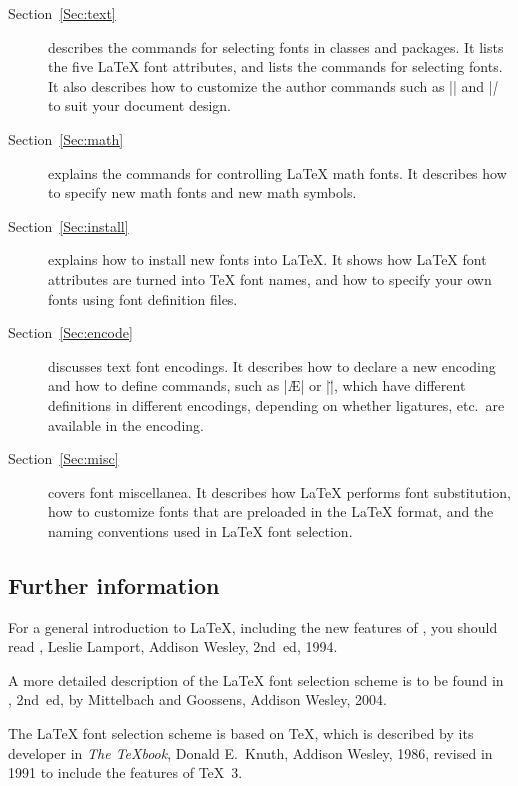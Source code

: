 \documentclass{ltxguide}[1995/11/28]
\begin{document}
\begin{description}
 
\item[Section~\ref{Sec:text}] describes the commands for selecting fonts
   in classes and packages.  It lists the five \LaTeX{} font
   attributes, and lists the commands for selecting fonts.  It also
   describes how to customize the author commands such as |\textrm| and
   |\textit| to suit your document design.
 
\item[Section~\ref{Sec:math}] explains the commands for controlling
   \LaTeX{} math fonts.  It describes how to specify new math fonts and
   new math symbols.
 
\item[Section~\ref{Sec:install}] explains how to install new fonts into
   \LaTeX.  It shows how \LaTeX{} font attributes are turned into \TeX{}
   font names, and how to specify your own fonts using font definition
   files.
 
\item[Section~\ref{Sec:encode}] discusses text font encodings.
   It describes how to declare a new encoding and how to define
   commands, such as |\AE| or |\"|, which have different definitions in
   different encodings, depending on whether ligatures, etc.\ are
   available in the encoding.
 
\item[Section~\ref{Sec:misc}] covers font miscellanea.  It describes how
   \LaTeX{} performs font substitution, how to customize fonts that are
   preloaded in the \LaTeX{} format, and the naming conventions used in
   \LaTeX{} font selection.
 
\end{description}
 
\subsection{Further information}
 
For a general introduction to \LaTeX, including the new features of
\LaTeXe, you should read \emph{\LaTeXbook},
Leslie Lamport, Addison Wesley, 2nd~ed, 1994.
 
A more detailed description of the \LaTeX{} font selection scheme is to
be found in \emph{\LaTeXcomp}, 2nd~ed, by Mittelbach and Goossens, Addison
Wesley, 2004.
 
The \LaTeX{} font selection scheme is based on \TeX, which is described
by its developer in \emph{The \TeX book}, Donald E.~Knuth, Addison
Wesley, 1986, revised in 1991 to include the features of \TeX~3.
 
\end{document}
